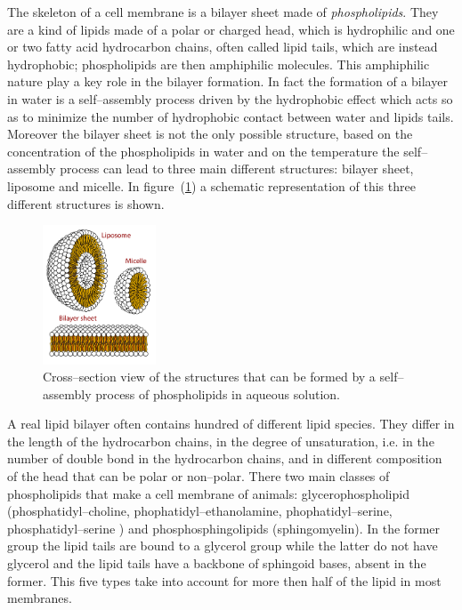 The skeleton of a cell membrane is a bilayer sheet made of \textit{phospholipids}. They are a kind of lipids made of a polar or charged head, which is hydrophilic and one or two fatty acid hydrocarbon chains, often called lipid tails, which are instead hydrophobic; phospholipids are then amphiphilic molecules. This amphiphilic nature play a key role in the bilayer formation. In fact the formation of a bilayer in water is a self--assembly process driven by the hydrophobic effect which acts so as to minimize the number of hydrophobic contact between water and lipids tails. Moreover the bilayer sheet is not the only possible structure, based on the concentration of the phospholipids in water and on the temperature the self--assembly process can lead to three main different structures: bilayer sheet, liposome and micelle. In figure~(\ref{fig:lipidsStructures}) a schematic representation of this three different structures is shown.
\begin{figure}
	\includegraphics[width=0.3\textwidth]{./img/lipidsStructures}
	\caption{Cross--section view of the structures that can be formed by a self--assembly process of phospholipids in aqueous solution.}
	\label{fig:lipidsStructures}
\end{figure}

A real lipid bilayer often contains hundred of different lipid species. They differ in the length of the hydrocarbon chains, in the degree of unsaturation, i.e. in the number of double bond in the hydrocarbon chains, and in different composition of the head that can be polar or non--polar. There two main classes of phospholipids that make a cell membrane of animals: glycerophospholipid (phosphatidyl--choline, phophatidyl--ethanolamine, phophatidyl--serine, phosphatidyl--serine ) and phosphosphingolipids (sphingomyelin). In the former group the lipid tails are bound to a glycerol group while the latter do not have glycerol and the lipid tails have a backbone of sphingoid bases, absent in the former. This five types take into account for more then half of the lipid in most membranes.

